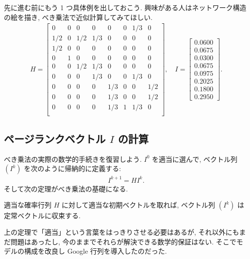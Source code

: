\documentclass[openany, a4paper, oneside]{jsbook}
\begin{document}
先に進む前にもう 1 つ具体例を出しておこう.
興味がある人はネットワーク構造の絵を描き,
べき乗法で近似計算してみてほしい.
\begin{align}
 H
 =
 \begin{bmatrix}
  0    &    0    &    0    &    0    &    0    &    0    &    1/3    &    0\\
  1/2    &    0    &    1/2    &    1/3    &    0    &    0    &    0    &    0\\
  1/2    &    0    &    0    &    0    &    0    &    0    &    0    &    0\\
  0    &    1    &    0    &    0    &    0    &    0    &    0    &    0\\
  0    &    0    &    1/2    &    1/3    &    0    &    0    &    0    &    0\\
  0    &    0    &    0    &    1/3    &    0    &    0    &    1/3    &    0\\
  0    &    0    &    0    &    0    &    1/3    &    0    &    0    &    1/2\\
  0    &    0    &    0    &    0    &    1/3    &    0    &    0    &    1/2\\
  0    &    0    &    0    &    0    &    1/3    &    1    &    1/3    &    0\\
 \end{bmatrix}, \quad
 I
 =
 \begin{bmatrix}
  0.0600\\
  0.0675\\
  0.0300\\
  0.0675\\
  0.0975\\
  0.2025\\
  0.1800\\
  0.2950
 \end{bmatrix}.
\end{align}
\subsection{ページランクベクトル $I$ の計算}

べき乗法の実際の数学的手続きを復習しよう.
$I^0$ を適当に選んで, ベクトル列 $(I^k)$ を次のように帰納的に定義する:
\begin{align}
 I^{k+1}
 =
 H I^{k}.
\end{align}
そして次の定理がべき乗法の基礎になる.
\begin{thm}
適当な確率行列 $H$ に対して適当な初期ベクトルを取れば,
ベクトル列 $(I^k)$ は定常ベクトルに収束する.
\end{thm}
上の定理で「適当」という言葉をはっきりさせる必要はあるが,
それ以外にもまだ問題はあったし, 今のままでそれらが解決できる数学的保証はない.
そこでモデルの構成を改良し Google 行列を導入したのだった.
\end{document}
